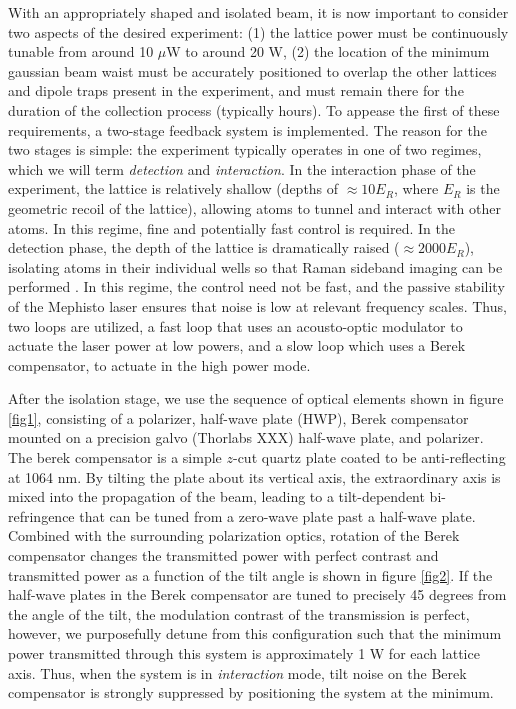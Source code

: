 \documentclass[twocolumn,aps,pra,showpacs,preprintnumbers,bibnotes]{revtex4-1}
\begin{document}
With an appropriately shaped and isolated beam, it is now important to consider two aspects of the desired experiment: (1) the lattice power must be continuously tunable from around 10 $\mu$W to around 20 W, (2) the location of the minimum gaussian beam waist must be accurately positioned to overlap the other lattices and dipole traps present in the experiment, and must remain there for the duration of the collection process (typically hours).
To appease the first of these requirements, a two-stage feedback system is implemented. The reason for the two stages is simple: the experiment typically operates in one of two regimes, which we will term \textit{detection} and \textit{interaction}. 
In the interaction phase of the experiment, the lattice is relatively shallow (depths of $\approx 10 E_R$, where $E_R$ is the geometric recoil of the lattice), allowing atoms to tunnel and interact with other atoms. 
In this regime, fine and potentially fast control is required.
In the detection phase, the depth of the lattice is dramatically raised ($\approx 2000 E_R$), isolating atoms in their individual wells so that Raman sideband imaging can be performed \cite{parsons2015}.
In this regime, the control need not be fast, and the passive stability of the Mephisto laser ensures that noise is low at relevant frequency scales.
Thus, two loops are utilized, a fast loop that uses an acousto-optic modulator to actuate the laser power at low powers, and a slow loop which uses a Berek compensator, to actuate in the high power mode.

After the isolation stage, we use the sequence of optical elements shown in figure \ref{fig1}, consisting of a polarizer, half-wave plate (HWP), Berek compensator mounted on a precision galvo (Thorlabs XXX) half-wave plate, and polarizer. The berek compensator is a simple $z$-cut quartz plate coated to be anti-reflecting at 1064 nm. 
By tilting the plate about its vertical axis, the extraordinary axis is mixed into the propagation of the beam, leading to a tilt-dependent bi-refringence that can be tuned from a zero-wave plate past a half-wave plate.
Combined with the surrounding polarization optics, rotation of the Berek compensator changes the transmitted power with perfect contrast and transmitted power as a function of the tilt angle is shown in figure \ref{fig2}.
If the half-wave plates in the Berek compensator are tuned to precisely 45 degrees from the angle of the tilt, the modulation contrast of the transmission is perfect, however, we purposefully detune from this configuration such that the minimum power transmitted through this system is approximately 1 W for each lattice axis. 
Thus, when the system is in \textit{interaction} mode, tilt noise on the Berek compensator is strongly suppressed by positioning the system at the minimum.
\end{document}
